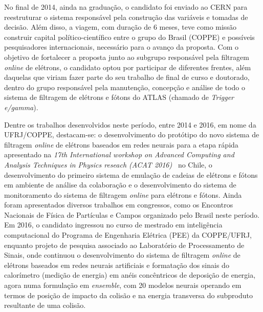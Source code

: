 No final de 2014, ainda na graduação, o candidato foi enviado ao CERN para reestruturar o sistema 
responsável pela construção das variáveis e tomadas de decisão. Além disso, a viagem, com duração 
de 6 meses, teve como missão construir capital político-científico entre o grupo do 
Brasil (COPPE) e possíveis pesquisadores internacionais, necessário para o avanço da 
proposta. Com o objetivo de fortalecer a proposta junto ao subgrupo responsável pela filtragem 
\emph{online} de elétrons, o candidato optou por participar de diferentes frentes, além 
daquelas que viriam fazer parte do seu trabalho de final de curso e doutorado, dentro do 
grupo responsável pela manutenção, concepção e análise de todo o sistema de filtragem de 
elétrons e fótons do ATLAS (chamado de \emph{Trigger e/gamma}).



Dentre os trabalhos desenvolvidos neste período, entre 2014 e 2016, em nome da UFRJ/COPPE, 
destacam-se: o desenvolvimento do protótipo do novo sistema de filtragem \emph{online} de elétrons 
baseados em redes neurais para a etapa rápida apresentado na \emph{17th International workshop on 
Advanced Computing and Analysis Techniques in Physics reseach (ACAT 2016)}~\cite{acat2016} no Chile, o 
desenvolvimento do primeiro sistema de emulação de cadeias de elétrons e fótons em ambiente de 
análise da colaboração e o desenvolvimento do sistema de monitoramento do sistema de 
filtragem \emph{online} para elétrons e fótons. Ainda foram apresentados diversos trabalhos em 
congressos, como os Encontros Nacionais de Física de Partículas e Campos 
organizado pelo Brasil neste período.
Em 2016, o candidato ingressou no curso de mestrado em inteligência computacional do 
Programa de Engenharia Elétrica (PEE) da COPPE/UFRJ, enquanto projeto de pesquisa associado 
ao Laboratório de Processamento de Sinais, onde continuou o desenvolvimento do sistema de 
filtragem \emph{online} de elétrons baseados em redes neurais artificiais e formatação dos sinais 
do calorímetro (medição de energia) em anéis concêntricos de deposição de energia, agora 
numa formulação em \emph{ensemble}, com 20 modelos neurais operando em termos de posição de impacto 
da colisão e na energia transversa do subproduto resultante de uma colisão.


